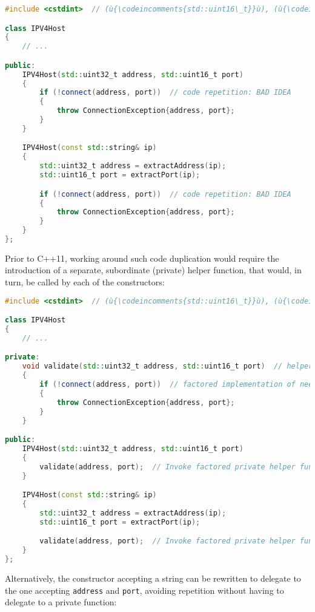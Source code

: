 \begin{lstlisting}[language=C++]
#include <cstdint>  // (ù{\codeincomments{std::uint16\_t}}ù), (ù{\codeincomments{std::uint32\_t}}ù)

class IPV4Host
{
    // ...

public:
    IPV4Host(std::uint32_t address, std::uint16_t port)
    {
        if (!connect(address, port))  // code repetition: BAD IDEA
        {
            throw ConnectionException{address, port};
        }
    }

    IPV4Host(const std::string& ip)
    {
        std::uint32_t address = extractAddress(ip);
        std::uint16_t port = extractPort(ip);

        if (!connect(address, port))  // code repetition: BAD IDEA
        {
            throw ConnectionException{address, port};
        }
    }
};
\end{lstlisting}

\noindent Prior to C++11, working around such code duplication would require the
introduction of a separate, subordinate (private) helper function, that
would, in turn, be called by each of the constructors:

\begin{lstlisting}[language=C++]
#include <cstdint>  // (ù{\codeincomments{std::uint16\_t}}ù), (ù{\codeincomments{std::uint32\_t}}ù)

class IPV4Host
{
    // ...

private:
    void validate(std::uint32_t address, std::uint16_t port)  // helper function
    {
        if (!connect(address, port))  // factored implementation of needed logic
        {
            throw ConnectionException{address, port};
        }
    }

public:
    IPV4Host(std::uint32_t address, std::uint16_t port)
    {
        validate(address, port);  // Invoke factored private helper function.
    }

    IPV4Host(const std::string& ip)
    {
        std::uint32_t address = extractAddress(ip);
        std::uint16_t port = extractPort(ip);

        validate(address, port);  // Invoke factored private helper function.
    }
};
\end{lstlisting}

\noindent Alternatively, the constructor accepting a string can be rewritten to
delegate to the one accepting \texttt{address} and \texttt{port},
avoiding repetition without having to delegate to a private function:


